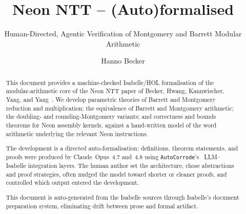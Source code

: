 \documentclass[preprint]{iacrtrans}
\title{Neon NTT -- (Auto)formalised}
\subtitle{Human-Directed, Agentic Verification of Montgomery and Barrett Modular Arithmetic}
\author{Hanno Becker}
\institute{Amazon Web Services, \email{beckphan@amazon.com}}
\begin{document}
\maketitle
{}


\begin{abstract}
  This document provides a machine-checked Isabelle/HOL formalisation of the
  modular-arithmetic core of the Neon NTT paper of Becker, Hwang,
  Kannwischer, Yang, and Yang~\cite{NeonNTT}. We develop
  parametric theories of Barrett and Montgomery reduction and
  multiplication; the equivalence of Barrett and Montgomery arithmetic;
  the doubling- and rounding-Montgomery variants; and correctness and
  bounds theorems for Neon assembly kernels, against a hand-written
  model of the word arithmetic underlying the relevant Neon instructions.

  The development is a directed auto-formalisation: definitions, theorem
  statements, and proofs were produced by Claude~Opus~4.7 and~4.8 using
  \texttt{AutoCorrode}'s~\cite{AutoCorrode} LLM--Isabelle integration layers.
  The human
  author set the architecture, chose abstractions and proof strategies,
  often nudged the model toward shorter or cleaner proofs, and
  controlled which output entered the development.

  This document is auto-generated from the Isabelle sources through
  Isabelle's document preparation system, eliminating drift between
  prose and formal artifact.
\end{abstract}

\tableofcontents

















\end{document}
